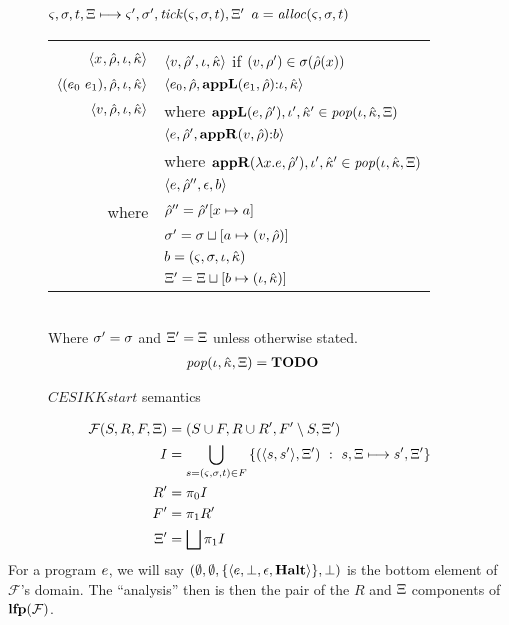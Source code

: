 \begin{figure}
  \centering
  $\varsigma,\sigma,t,\Xi \longmapsto \varsigma',\sigma',\mathit{tick}(\varsigma,\sigma,t),\Xi'$ \quad $a = \mathit{alloc}(\varsigma,\sigma,t)$ \\
  \begin{tabular}{r|l}
    \hline\vspace{-3mm}\\
    $\langle x^{{}}, \hat{\rho}, \iota, \hat{\kappa} \rangle$
    &
    $\langle v, \hat{\rho}',\iota,\hat{\kappa} \rangle$ if $(v,\rho') \in \sigma(\hat{\rho}(x))$
    \\
    $\langle (e_{0}\ e_{1}){},\hat{\rho},\iota,\hat{\kappa} \rangle$
    &
    $\langle e_{0},\hat{\rho},\mathbf{appL}(e_{1},\hat{\rho}){\tt :} \iota,\hat{\kappa} \rangle$
    \\
    $\langle v,\hat{\rho}, \iota,\hat{\kappa} \rangle$
    &
    where $\mathbf{appL}(e,\hat{\rho}'), \iota',\hat{\kappa}' \in \mathit{pop}(\iota,\hat{\kappa},\Xi)$ \\
    &
    $\langle e,\hat{\rho}',\mathbf{appR}(v,\hat{\rho}){\tt :} b \rangle$
    \\
    & where $\mathbf{appR}(\lambda{} x. e,\hat{\rho}'), \iota', \hat{\kappa}' \in \mathit{pop}(\iota,\hat{\kappa},\Xi)$ \\
    &
    $\langle e,\hat{\rho}'',\epsilon,b \rangle$ \\
    where & $\hat{\rho}'' = \hat{\rho}'[x\mapsto a]$ \\
    & $\sigma' = \sigma\sqcup[a \mapsto (v,\hat{\rho})]$ \\
    & $b = (\varsigma,\sigma,\iota,\hat{\kappa})$ \\
    & $\Xi' = \Xi\sqcup[b \mapsto (\iota,\hat{\kappa})]$
  \end{tabular} \\
  Where $\sigma' = \sigma$ and $\Xi' = \Xi$ unless otherwise stated.
  \begin{align*}
    \mathit{pop}(\iota,\hat{\kappa},\Xi) &= \mathbf{TODO}
  \end{align*}
  \caption{$CESIKKstart$ semantics}
  \label{fig:cesikkstart-semantics}
\end{figure}

\begin{align*}
  {\mathcal F}(S,R,F,\Xi) &= (S \cup F, R \cup R', F'\setminus S, \Xi') \\
  I &= \bigcup\limits_{s=(\varsigma,\sigma,t) \in F}{\{ (\langle s,s' \rangle, \Xi')\ :\ s,\Xi \longmapsto s',\Xi'\}} \\
  R' &= \pi_0 I \\
  F' &= \pi_1 R' \\
  \Xi' &= \bigsqcup\pi_1 I
\end{align*}
For a program $e$, we will say $(\emptyset,\emptyset,\{ \langle e,\bot,\epsilon,\mathbf{Halt} \rangle \},\bot)$ is the bottom element of ${\mathcal F}$'s domain.
%
The ``analysis'' then is then the pair of the $R$ and $\Xi$ components of $\mathbf{lfp}({\mathcal F})$.

\begin{theorem}[Correctness]
\end{theorem}